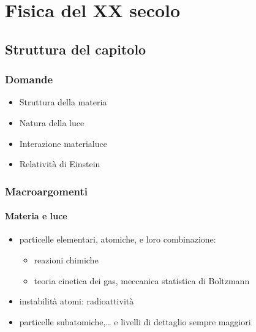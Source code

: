 \documentclass[letterpaper,10pt,italian]{jupyterBook}
\begin{document}
\sphinxstepscope


\chapter{Fisica del XX secolo}
\label{\detokenize{ch/modern:fisica-del-xx-secolo}}\label{\detokenize{ch/modern:physics-hs-modern}}\label{\detokenize{ch/modern::doc}}

\section{Struttura del capitolo}
\label{\detokenize{ch/modern:struttura-del-capitolo}}

\subsection{Domande}
\label{\detokenize{ch/modern:domande}}\begin{itemize}
\item {} 
\sphinxAtStartPar
Struttura della materia

\item {} 
\sphinxAtStartPar
Natura della luce

\item {} 
\sphinxAtStartPar
Interazione materia\sphinxhyphen{}luce

\item {} 
\sphinxAtStartPar
Relatività di Einstein

\end{itemize}


\subsection{Macro\sphinxhyphen{}argomenti}
\label{\detokenize{ch/modern:macro-argomenti}}

\subsubsection{Materia e luce}
\label{\detokenize{ch/modern:materia-e-luce}}
\sphinxAtStartPar
{}
\begin{itemize}
\item {} 
\sphinxAtStartPar
particelle elementari, atomiche, e loro combinazione:
\begin{itemize}
\item {} 
\sphinxAtStartPar
reazioni chimiche

\item {} 
\sphinxAtStartPar
teoria cinetica dei gas, meccanica statistica di Boltzmann

\end{itemize}

\item {} 
\sphinxAtStartPar
instabilità atomi: radioattività

\item {} 
\sphinxAtStartPar
particelle sub\sphinxhyphen{}atomiche,… e livelli di dettaglio sempre maggiori

\end{itemize}
\end{document}

